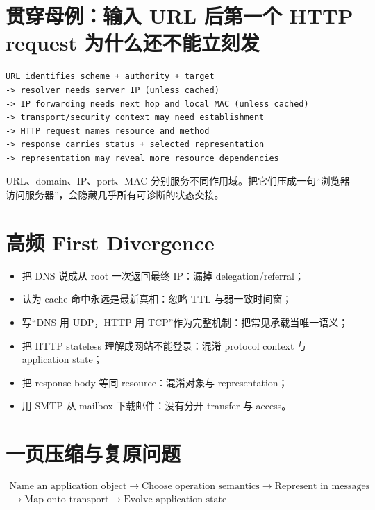 \documentclass[UTF8,fontset=none,11pt,a4paper]{ctexart}
\providecommand{\tightlist}{\setlength{\itemsep}{0pt}\setlength{\parskip}{0pt}}
\begin{document}
\section{贯穿母例：输入 URL 后第一个 HTTP request
为什么还不能立刻发}\label{11-ux8d2fux7a7fux6bcdux4f8bux8f93ux5165-url-ux540eux7b2cux4e00ux4e2a-http-request-ux4e3aux4ec0ux4e48ux8fd8ux4e0dux80fdux7acbux523bux53d1}

\begin{lstlisting}
URL identifies scheme + authority + target
-> resolver needs server IP (unless cached)
-> IP forwarding needs next hop and local MAC (unless cached)
-> transport/security context may need establishment
-> HTTP request names resource and method
-> response carries status + selected representation
-> representation may reveal more resource dependencies
\end{lstlisting}

URL、domain、IP、port、MAC
分别服务不同作用域。把它们压成一句``浏览器访问服务器''，会隐藏几乎所有可诊断的状态交接。

\section{高频 First
Divergence}\label{12-ux9ad8ux9891-first-divergence}

\begin{itemize}
\tightlist
\item
  把 DNS 说成从 root 一次返回最终 IP：漏掉 delegation/referral；
\item
  认为 cache 命中永远是最新真相：忽略 TTL 与弱一致时间窗；
\item
  写``DNS 用 UDP，HTTP 用 TCP''作为完整机制：把常见承载当唯一语义；
\item
  把 HTTP stateless 理解成网站不能登录：混淆 protocol context 与
  application state；
\item
  把 response body 等同 resource：混淆对象与 representation；
\item
  用 SMTP 从 mailbox 下载邮件：没有分开 transfer 与 access。
\end{itemize}

\section{一页压缩与复原问题}\label{13-ux4e00ux9875ux538bux7f29ux4e0eux590dux539fux95eeux9898}

\[
\boxed{\begin{gathered}
\text{Name an application object}\to\text{Choose operation semantics}\to
\text{Represent in messages}\\
\to\text{Map onto transport}\to\text{Evolve application state}
\end{gathered}}
\]
\end{document}
